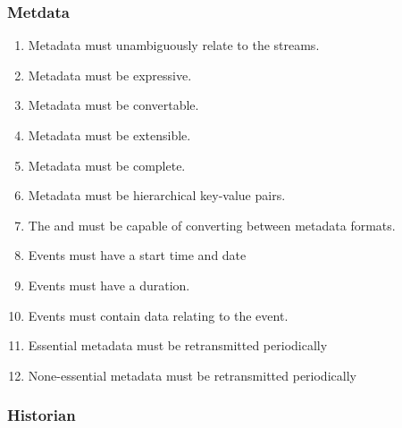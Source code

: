 \subsubsection{Metdata}

\begin{enumerate}
	\item Metadata must unambiguously relate to the streams.
	\item Metadata must be expressive.
	\item Metadata must be convertable.
	\item Metadata must be extensible.
	\item Metadata must be complete.
	\item Metadata must be hierarchical key-value pairs.
	\item The  and  must be capable of converting between metadata formats.
	\item Events must have a start time and date
	\item Events must have a duration.
	\item Events must contain data relating to the event.
	\item Essential metadata must be retransmitted periodically
	\item None-essential metadata must be retransmitted periodically
\end{enumerate}

\subsubsection{Historian}
